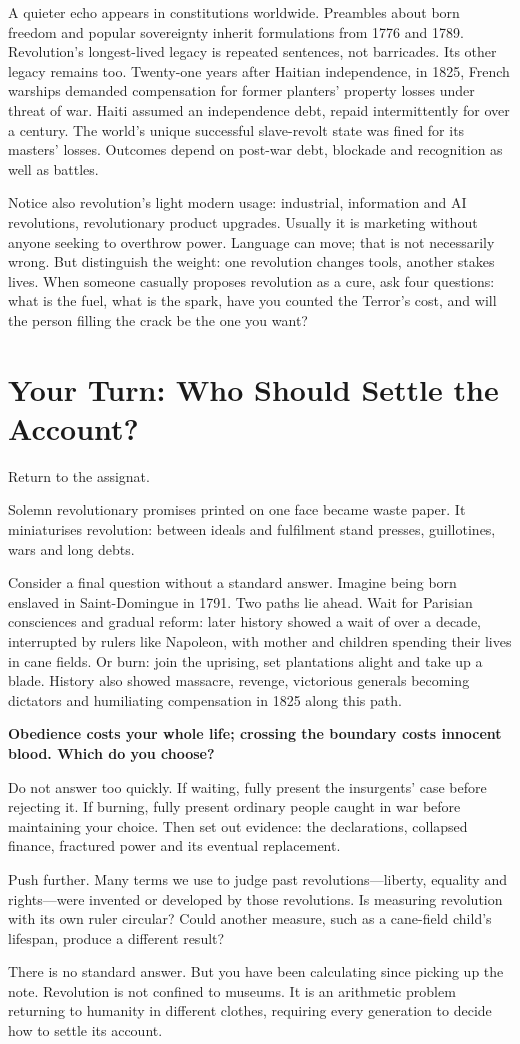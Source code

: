 A quieter echo appears in constitutions worldwide. Preambles about born freedom and popular sovereignty inherit formulations from 1776 and 1789. Revolution's longest-lived legacy is repeated sentences, not barricades. Its other legacy remains too. Twenty-one years after Haitian independence, in 1825, French warships demanded compensation for former planters' property losses under threat of war. Haiti assumed an independence debt, repaid intermittently for over a century. The world's unique successful slave-revolt state was fined for its masters' losses. Outcomes depend on post-war debt, blockade and recognition as well as battles.

Notice also revolution's light modern usage: industrial, information and AI revolutions, revolutionary product upgrades. Usually it is marketing without anyone seeking to overthrow power. Language can move; that is not necessarily wrong. But distinguish the weight: one revolution changes tools, another stakes lives. When someone casually proposes revolution as a cure, ask four questions: what is the fuel, what is the spark, have you counted the Terror's cost, and will the person filling the crack be the one you want?

\section{Your Turn: Who Should Settle the Account?}
Return to the assignat.

Solemn revolutionary promises printed on one face became waste paper. It miniaturises revolution: between ideals and fulfilment stand presses, guillotines, wars and long debts.

Consider a final question without a standard answer. Imagine being born enslaved in Saint-Domingue in 1791. Two paths lie ahead. Wait for Parisian consciences and gradual reform: later history showed a wait of over a decade, interrupted by rulers like Napoleon, with mother and children spending their lives in cane fields. Or burn: join the uprising, set plantations alight and take up a blade. History also showed massacre, revenge, victorious generals becoming dictators and humiliating compensation in 1825 along this path.

\textbf{Obedience costs your whole life; crossing the boundary costs innocent blood. Which do you choose?}

Do not answer too quickly. If waiting, fully present the insurgents' case before rejecting it. If burning, fully present ordinary people caught in war before maintaining your choice. Then set out evidence: the declarations, collapsed finance, fractured power and its eventual replacement.

Push further. Many terms we use to judge past revolutions---liberty, equality and rights---were invented or developed by those revolutions. Is measuring revolution with its own ruler circular? Could another measure, such as a cane-field child's lifespan, produce a different result?

There is no standard answer. But you have been calculating since picking up the note. Revolution is not confined to museums. It is an arithmetic problem returning to humanity in different clothes, requiring every generation to decide how to settle its account.
